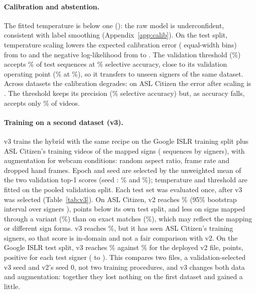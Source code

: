 \paragraph{Calibration and abstention.}
The fitted temperature is below one (): the raw model is underconfident, consistent with
label smoothing (Appendix~\ref{app:calib}). On the test split, temperature scaling lowers the
expected calibration error ( equal-width bins) from 
 to   and the negative log-likelihood from
 to . The validation threshold (\%) accepts
\% of test sequences at \% selective accuracy, close to its
validation operating point (\% at \%), so it transfers to unseen
signers of the same dataset. Across datasets the calibration degrades: on ASL Citizen the error
after scaling is . The threshold keeps its precision (\% selective
accuracy) but, as accuracy falls, accepts only \% of videos.

\paragraph{Training on a second dataset (v3).}
v3 trains the hybrid with the same recipe on the Google ISLR training split plus ASL Citizen's
training videos of the mapped signs ( sequences by  signers), with
augmentation for webcam conditions: random aspect ratio, frame rate and dropped hand frames. Epoch
and seed are selected by the unweighted mean of the two validation top-1 scores (seed :
\% and \%); temperature and threshold are fitted on the pooled
validation split. Each test set was evaluated once, after v3 was selected (Table~\ref{tab:v3}). On
ASL Citizen, v2 reaches \% (95\% bootstrap interval over signers
), 
points below its own test split, and less on signs mapped through a variant (\%)
than on exact matches (\%), which may reflect the mapping or different sign forms.
v3 reaches \%, but it has seen ASL Citizen's training signers, so that score is
in-domain and not a fair comparison with v2. On the Google ISLR test split, v3 reaches
\% against \% for the deployed v2 file,  points, positive
for each test signer ( to ). This compares two files, a
validation-selected v3 seed and v2's seed 0, not two training procedures, and v3 changes both data
and augmentation: together they lost nothing on the first dataset and gained a little.


